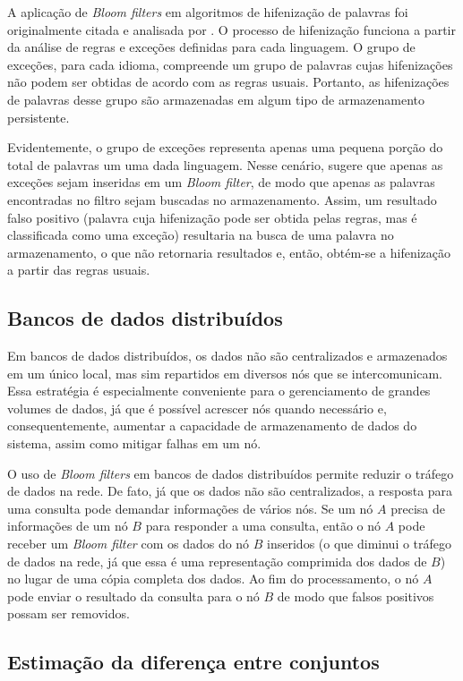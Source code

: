 \documentclass[12pt,twoside,english,brazilian]{book}
\begin{document}
A aplicação de \textit{Bloom filters} em algoritmos de hifenização de palavras foi originalmente citada e analisada por \citet{bloom}. O processo de hifenização funciona a partir da análise de regras e exceções definidas para cada linguagem. O grupo de exceções, para cada idioma, compreende um grupo de palavras cujas hifenizações não podem ser obtidas de acordo com as regras usuais. Portanto, as hifenizações de palavras desse grupo são armazenadas em algum tipo de armazenamento persistente.

Evidentemente, o grupo de exceções representa apenas uma pequena porção do total de palavras um uma dada linguagem. Nesse cenário, \citet{bloom} sugere que apenas as exceções sejam inseridas em um \textit{Bloom filter}, de modo que apenas as palavras encontradas no filtro sejam buscadas no armazenamento. Assim, um resultado falso positivo (palavra cuja hifenização pode ser obtida pelas regras, mas é classificada como uma exceção) resultaria na busca de uma palavra no armazenamento, o que não retornaria resultados e, então, obtém-se a hifenização a partir das regras usuais. 

\subsection{Bancos de dados distribuídos}

Em bancos de dados distribuídos, os dados não são centralizados e armazenados em um único local, mas sim repartidos em diversos nós que se intercomunicam. Essa estratégia é especialmente conveniente para o gerenciamento de grandes volumes de dados, já que é possível acrescer nós quando necessário e, consequentemente, aumentar a capacidade de armazenamento de dados do sistema, assim como mitigar falhas em um nó.

O uso de \textit{Bloom filters} em bancos de dados distribuídos permite reduzir o tráfego de dados na rede. De fato, já que os dados não são centralizados, a resposta para uma consulta pode demandar informações de vários nós. Se um nó $A$ precisa de informações de um nó $B$ para responder a uma consulta, então o nó $A$ pode receber um \textit{Bloom filter} com os dados do nó $B$ inseridos (o que diminui o tráfego de dados na rede, já que essa é uma representação comprimida dos dados de $B$) no lugar de uma cópia completa dos dados. Ao fim do processamento, o nó $A$ pode enviar o resultado da consulta para o nó $B$ de modo que falsos positivos possam ser removidos.

\subsection{Estimação da diferença entre conjuntos}
\end{document}
